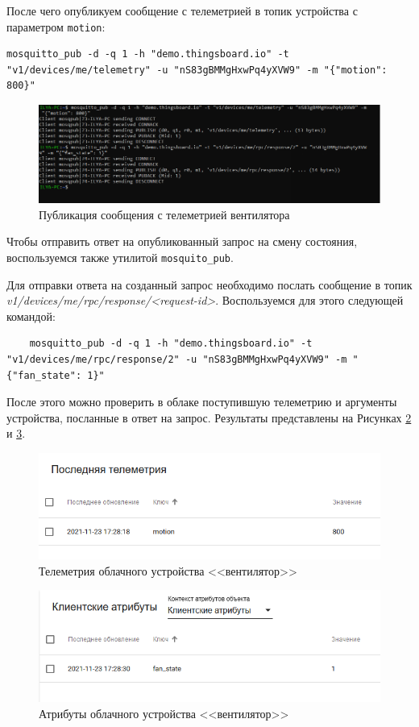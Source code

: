 \documentclass[a4paper,14pt]{extarticle}
\begin{document}
После чего опубликуем сообщение с телеметрией в топик устройства с параметром
\texttt{motion}:

\begin{lstlisting}
mosquitto_pub -d -q 1 -h "demo.thingsboard.io" -t "v1/devices/me/telemetry" -u "nS83gBMMgHxwPq4yXVW9" -m "{"motion": 800}"
\end{lstlisting}

\begin{figure}[h!]
	\centering
	\includegraphics[width=0.6\linewidth]{images/t1-sender}
	\caption{Публикация сообщения с телеметрией вентилятора}
	\label{fig:t1-sender}
\end{figure}

Чтобы отправить ответ на опубликованный запрос на смену состояния, воспользуемся
также утилитой \texttt{mosquito\_pub}.

Для отправки ответа на созданный запрос необходимо послать сообщение в топик
\textit{v1/devices/me/rpc/response/<request-id>}. Воспользуемся для этого следующей командой:

\begin{lstlisting}
	mosquitto_pub -d -q 1 -h "demo.thingsboard.io" -t "v1/devices/me/rpc/response/2" -u "nS83gBMMgHxwPq4yXVW9" -m "{"fan_state": 1}"
\end{lstlisting}

После этого можно проверить в облаке поступившую телеметрию и аргументы устройства,
посланные в ответ на запрос. Результаты представлены на Рисунках \ref{fig:tel} и \ref{fig:attr}.

\begin{figure}[h!]
	\centering
	\includegraphics[width=0.6\linewidth]{images/tel}
	\caption{Телеметрия облачного устройства <<вентилятор>>}
	\label{fig:tel}
\end{figure}


\begin{figure}[h!]
	\centering
	\includegraphics[width=0.6\linewidth]{images/attr}
	\caption{Атрибуты облачного устройства <<вентилятор>>}
	\label{fig:attr}
\end{figure}
\end{document}
